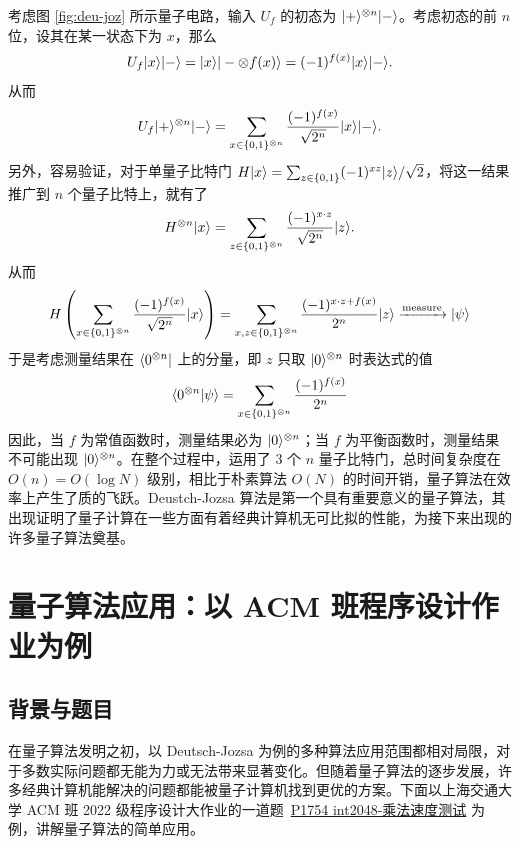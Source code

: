 \documentclass[a4paper,11pt,onecolumn,twoside]{article}
\begin{document}
考虑图 \ref{fig:deu-joz} 所示量子电路，输入 $U_f$ 的初态为 $|+\rangle^{\otimes n}|-\rangle$。考虑初态的前 $n$ 位，设其在某一状态下为 $x$，那么 \begin{align}
    U_f|x\rangle|-\rangle=|x\rangle|-\otimes f(x)\rangle=(-1)^{f(x)}|x\rangle|-\rangle.
\end{align}
从而 \begin{align}
    U_f|+\rangle^{\otimes n}|-\rangle=\sum_{x\in\{0,1\}^{\otimes n}}\frac{(-1)^{f(x)}}{\sqrt{2^n}}|x\rangle|-\rangle.
\end{align}
另外，容易验证，对于单量子比特门 $H|x\rangle=\sum_{z\in\{0,1\}}(-1)^{xz}|z\rangle/\sqrt{2}$，将这一结果推广到 $n$ 个量子比特上，就有了 \begin{align}
    H^{\otimes n}|x\rangle=\sum_{z\in\{0,1\}^{\otimes n}}\frac{(-1)^{x\cdot z}}{\sqrt{2^n}}|z\rangle.
\end{align}
从而 \begin{align}
    H\left(\sum_{x\in\{0,1\}^{\otimes n}}\frac{(-1)^{f(x)}}{\sqrt{2^n}}|x\rangle\right)=\sum_{x,z\in\{0,1\}^{\otimes n}}\frac{(-1)^{x\cdot z+f(x)}}{2^n}|z\rangle\xrightarrow{\text{measure}}|\psi\rangle
\end{align}
于是考虑测量结果在 $\langle0^{\otimes n}|$ 上的分量，即 $z$ 只取 $|0\rangle^{\otimes n}$ 时表达式的值 \begin{align}
    \langle0^{\otimes n}|\psi\rangle=\sum_{x\in\{0,1\}^{\otimes n}}\frac{(-1)^{f(x)}}{2^n}
\end{align}
因此，当 $f$ 为常值函数时，测量结果必为 $|0\rangle^{\otimes n}$；当 $f$ 为平衡函数时，测量结果不可能出现 $|0\rangle^{\otimes n}$。在整个过程中，运用了 $3$ 个 $n$ 量子比特门，总时间复杂度在 $O(n) = O(\log N)$ 级别，相比于朴素算法 $O(N)$ 的时间开销，量子算法在效率上产生了质的飞跃。Deustch-Jozsa 算法是第一个具有重要意义的量子算法，其出现证明了量子计算在一些方面有着经典计算机无可比拟的性能，为接下来出现的许多量子算法奠基。


\section{量子算法应用：以 ACM 班程序设计作业为例}

\subsection{背景与题目}

在量子算法发明之初，以 Deutsch-Jozsa 为例的多种算法应用范围都相对局限，对于多数实际问题都无能为力或无法带来显著变化。但随着量子算法的逐步发展，许多经典计算机能解决的问题都能被量子计算机找到更优的方案。下面以上海交通大学 ACM 班 2022 级程序设计大作业的一道题\ \href{https://acm.sjtu.edu.cn/OnlineJudge/problem?problem_id=1754}{P1754 int2048-乘法速度测试} 为例，讲解量子算法的简单应用。
\end{document}
